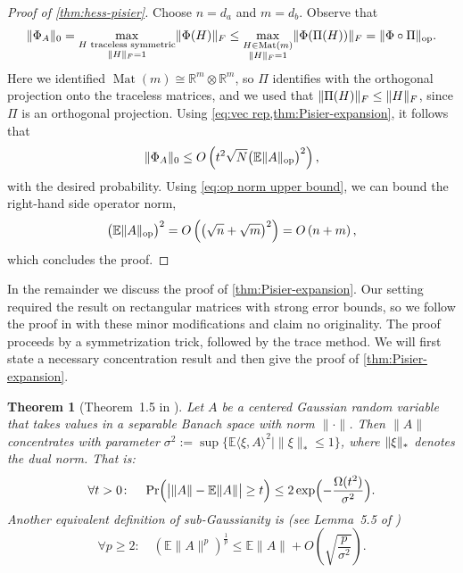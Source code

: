 \documentclass[aos]{imsart}
\newtheorem{theorem}{Theorem}[section]
\theoremstyle{definition}
\numberwithin{equation}{section}
\DeclareMathOperator{\op}{op}
\DeclareMathOperator{\Mat}{Mat}
\DeclarePairedDelimiter{\abs}{\lvert}{\rvert}
\DeclarePairedDelimiter{\norm}{\lVert}{\rVert}
\newcommand{\R}{{\mathbb{R}}}
\newcommand{\ot}{\otimes}
\newcommand{\E}{\mathbb{E}}
\begin{document}
\begin{appendix}
\begin{proof}[Proof of \cref{thm:hess-pisier}]
Choose $n=d_a$ and $m=d_b$.
Observe that
\begin{align*}
  \norm{\Phi_A}_0
= \max_{\substack{H \text{ traceless symmetric} \\ \norm H_F=1}} \norm{\Phi(H)}_F
\leq %
\max_{\substack{H \in \Mat(m) \\ \norm H_F = 1}} \norm{\Phi(\Pi(H))}_F
= \norm{\Phi \circ \Pi}_{\op}.
\end{align*}
Here we identified $\Mat(m) \cong \R^m \ot \R^m$, so $\Pi$ identifies with the orthogonal projection onto the traceless matrices, and we used that $\norm{\Pi(H)}_F \leq \norm{H}_F$, since $\Pi$ is an orthogonal projection.
Using \cref{eq:vec rep,thm:Pisier-expansion}, it follows that
\begin{align*}
  \norm{\Phi_A}_0 \leq O\left( t^2 \sqrt{N} \bigl( \E \norm{A}_{\op} \bigr)^2 \right),
\end{align*}
with the desired probability.
Using \cref{eq:op norm upper bound}, we can bound the right-hand side operator norm,
\begin{align*}
  \bigl( \E \norm{A}_{\op} \bigr)^2
= O\left( \left( \sqrt{n} + \sqrt{m} \right)^2 \right)
= O\left(n+m\right),
\end{align*}
which concludes the proof.
\end{proof}

In the remainder we discuss the proof of \cref{thm:Pisier-expansion}.
Our setting required the result on rectangular matrices with strong error bounds, so we follow the proof in \cite{pisier2012grothendieck} with these minor modifications and claim no originality.
The proof proceeds by a symmetrization trick, followed by the trace method.
We will first state a necessary concentration result and then give the proof of \cref{thm:Pisier-expansion}.

\begin{theorem}[Theorem~1.5 in \cite{P86}]\label{thm:banach conc}
Let $A$ be a centered Gaussian random variable that takes values in a separable Banach space with norm $\|\cdot\|$.
Then $\|A\|$ concentrates with parameter $\sigma^2 := \sup \{ \E \langle \xi, A \rangle^{2} \mid \|\xi\|_{*} \leq 1 \}$, where $\norm{\xi}_*$ denotes the dual norm.
That is:
\[ \forall t > 0 \colon \quad \Pr\Bigl( \abs[\big]{\norm A - \E \norm A} \geq t\Bigr) \leq 2 \exp\Bigl( - \frac{\Omega(t^2)}{\sigma^{2}}\Bigr).   \]
Another equivalent definition of sub-Gaussianity is (see Lemma~5.5 of \cite{vershynin2010introduction})
\begin{equation}\label{eq:conc via moments}
  \forall p \geq 2 \colon \quad (\E \|A\|^{p})^{\frac{1}{p}} \leq \E \|A\| + O \left( \sqrt{\frac{p}{\sigma^{2}}} \right).
\end{equation}
\end{theorem}


\end{appendix}
\end{document}
